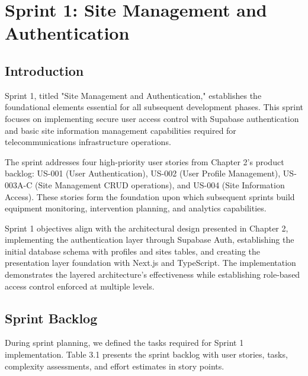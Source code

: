 \newpage

\chapter{Sprint 1: Site Management and Authentication}

\cfoot{\thepage}

\parindent=0.5in
\onehalfspacing

\usepackage{multirow}

\section{Introduction}

Sprint 1, titled "Site Management and Authentication," establishes the foundational elements essential for all subsequent development phases. This sprint focuses on implementing secure user access control with Supabase authentication and basic site information management capabilities required for telecommunications infrastructure operations.

The sprint addresses four high-priority user stories from Chapter 2's product backlog: US-001 (User Authentication), US-002 (User Profile Management), US-003A-C (Site Management CRUD operations), and US-004 (Site Information Access). These stories form the foundation upon which subsequent sprints build equipment monitoring, intervention planning, and analytics capabilities.

Sprint 1 objectives align with the architectural design presented in Chapter 2, implementing the authentication layer through Supabase Auth, establishing the initial database schema with profiles and sites tables, and creating the presentation layer foundation with Next.js and TypeScript. The implementation demonstrates the layered architecture's effectiveness while establishing role-based access control enforced at multiple levels.

\section{Sprint Backlog}

During sprint planning, we defined the tasks required for Sprint 1 implementation. Table 3.1 presents the sprint backlog with user stories, tasks, complexity assessments, and effort estimates in story points.

